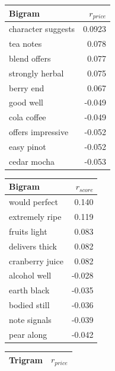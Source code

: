 \documentclass[12pt]{IEEEtran}
\begin{document}
\begin{figure}[h]
    \centering
    \begin{subfigure}{\columnwidth}
    \centering
    \small
    \begin{tabular}{ |l|r| }
        \hline
        Bigram & $r_{price}$ \\
        \hline
        \hline
        character suggests & 0.0923 \\
	    tea notes & 0.078 \\
	    blend offers & 0.077 \\
	    strongly herbal & 0.075 \\
	    berry end & 0.067 \\
        \hline
        good well & -0.049 \\
        cola coffee & -0.049 \\
        offers impressive & -0.052 \\
        easy pinot & -0.052 \\
        cedar mocha & -0.053 \\
        \hline
    \end{tabular}
    \end{subfigure}
    \begin{subfigure}{\columnwidth}
    \centering
    \small
    \begin{tabular}{ |l|r| }
        \hline
        Bigram & $r_{score}$ \\
        \hline
        \hline
        would perfect & 0.140 \\
	    extremely ripe & 0.119 \\ 
	    fruits light & 0.083 \\
	    delivers thick & 0.082 \\
	    cranberry juice & 0.082 \\
        \hline
        alcohol well &  -0.028 \\
        earth black &  -0.035 \\
        bodied still & -0.036 \\
        note signals & -0.039 \\
        pear along & -0.042 \\
        \hline
    \end{tabular}
    \end{subfigure}
    \begin{subfigure}{\columnwidth}
    \centering
    \small
    \begin{tabular}{ |l|r| }
        \hline
        Trigram & $r_{price}$ \\
        \hline
        \hline


\end{tabular}
\end{subfigure}
\end{figure}
\end{document}
